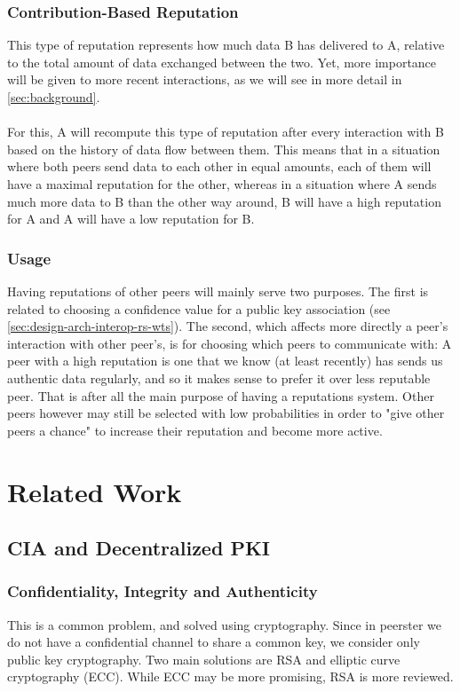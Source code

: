 \documentclass[]{article}
\begin{document}
\subsubsection{Contribution-Based Reputation}
This type of reputation represents how much data B has delivered to A, relative to the total amount of data exchanged between the two.
Yet, more importance will be given to more recent interactions, as we will see in more detail in \ref{sec:background}.
\\\\
For this, A will recompute this type of reputation after every interaction with B based on the history of data flow between them.
This means that in a situation where both peers send data to each other in equal amounts, each of them will have a maximal reputation for the other, whereas in a situation where A sends much more data to B than the other way around, B will have a high reputation for A and A will have a low reputation for B.

\subsubsection{Usage}
Having reputations of other peers will mainly serve two purposes.
The first is related to choosing a confidence value for a public key association (see \ref{sec:design-arch-interop-rs-wts}).
The second, which affects more directly a peer's interaction with other peer's, is for choosing which peers to communicate with:
A peer with a high reputation is one that we know (at least recently) has sends us authentic data regularly, and so it makes sense to prefer it over less reputable peer.
That is after all the main purpose of having a reputations system.
Other peers however may still be selected with low probabilities in order to "give other peers a chance" to increase their reputation and become more active.

\section{Related Work}

\subsection{CIA and Decentralized PKI}

\subsubsection{Confidentiality, Integrity and Authenticity}
This is a common problem, and solved using cryptography. Since in peerster we do not have a confidential channel to share a common key, we consider only public key cryptography. Two main solutions are RSA \cite{RFC8017} and elliptic curve cryptography (ECC). While ECC may be more promising, RSA is more reviewed.
\end{document}
